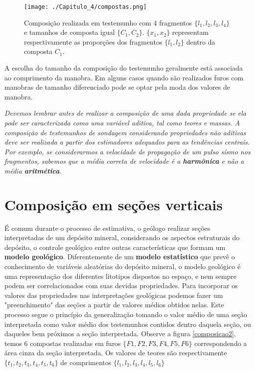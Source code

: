 \FloatBarrier
\begin{figure}[!htpb]
	\centering
	\texttt{[image: ./Capitulo\_4/compostas.png]}	
	\caption{Composição realizada em testemunho com 4 fragmentos $\{l_{1},l_{2},l_{3},l_{4}\}$ e tamanhos de composta igual  $\{C_{1},C_{2}\}$. $\{x_{1},x_{2}\}$ representam respectivamente as proporções dos fragmentos $\{l_{1},l_{2}\}$ dentro da composta $C_{1}$.  }
	\label{composicao}
\end{figure}
\FloatBarrier 

A escolha do tamanho da composição do testemunho geralmente está associada ao comprimento da manobra. Em alguns casos quando são realizados furos com manobras de tamanho diferenciado pode se optar pela moda dos valores de manobra. 

\begin{proposition}
	\textit{Devemos lembrar antes de realizar a composição de uma dada propriedade se ela pode ser caracterizada como uma variável aditiva, tal como teores e massas. A composição de testemunhos de sondagem considerando propriedades não aditivas deve ser realizada a partir dos estimadores adequados para as tendências centrais. Por exemplo, se considerarmos a velocidade de propagação de um pulso sísmo nos fragmentos, sabemos que a média correta de velocidade é a \textbf{harmônica} e não a média \textbf{aritmética}.}
\end{proposition} 

\section{Composição em seções verticais }

É comum durante o processo de estimativa, o geólogo realizar seções interpretadas de um depósito mineral, considerando os aspectos estruturais do depósito, o controle geológico entre outras características que formam um \textbf{modelo geológico}. Diferentemente de um \textbf{modelo estatístico} que prevê o conhecimento de variáveis aleatórias do depósito mineral,  o modelo geológico é uma representação dos diferentes litotipos dispostos no espaço, e nem sempre podem ser correlacionados com suas devidas propriedades. Para incorporar os valores das propriedades nas interpretações geológicas podemos fazer um "preenchimento" das seções a partir de valores médios obtidos nelas.  Este processo segue o princípio da generalização tomando o valor médio de uma seção interpretada como valor médio dos testemunhos contidos dentro daquela seção, ou daqueles bem próximos a seção interpretada. Observe a figura \ref{composicao2}, temos 6 compostas realizadas em furos $\{F1, F2, F3, F4, F5, F6\}$ correspondendo a área cinza da seção interpretada. Os valores de teores são respectivamente $\{t_{1},t_{2},t_{3},t_{4},t_{5}, t_{6}\}$ de comprimentos $\{l_{1},l_{2},l_{3},l_{4},l_{5}, l_{6}\}$

